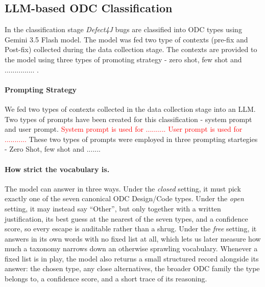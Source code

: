 \subsection{LLM-based ODC Classification}
\label{subsec:classification}
In the classification stage \textit{Defect4J} bugs are classified into ODC types using Gemini 3.5 Flash model. The model was fed two type of contexts (pre-fix and Post-fix) collected during the data collection stage. The contexts are provided to the model using three types of promoting strategy - zero shot, few shot and ............... . 

\paragraph{Prompting Strategy} We fed two types of contexts collected in the data collection stage into an LLM. Two types of prompts have been created for this classification - system prompt and user prompt. \textcolor{red}{System prompt is used for .......... User prompt is used for ...........} These two types of prompts were employed in three prompting startegies - Zero Shot, few shot and .......


\paragraph{How strict the vocabulary is.}
The model can answer in three ways. Under the \textit{closed} setting, it must
pick exactly one of the seven canonical ODC Design/Code types. Under the
\textit{open} setting, it may instead say ``Other'', but only together with a
written justification, its best guess at the nearest of the seven types, and a
confidence score, so every escape is auditable rather than a shrug. Under the
\textit{free} setting, it answers in its own words with no fixed list at all,
which lets us later measure how much a taxonomy narrows down an otherwise
sprawling vocabulary. Whenever a fixed list is in play, the model also returns a
small structured record alongside its answer: the chosen type, any close
alternatives, the broader ODC family the type belongs to, a confidence score, and
a short trace of its reasoning.

